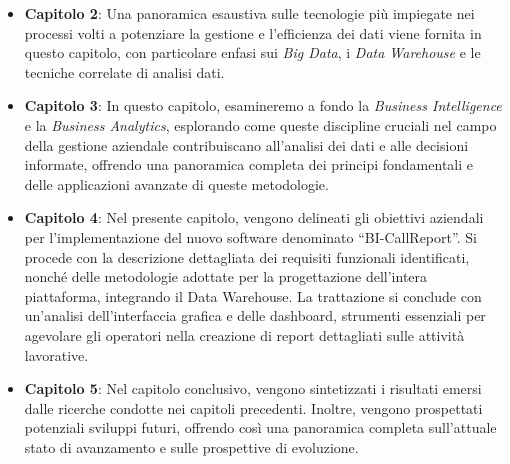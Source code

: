 \begin{itemize}
    \item \textbf{Capitolo 2}: Una panoramica esaustiva sulle tecnologie più impiegate nei processi volti a potenziare la gestione e l'efficienza dei dati viene fornita in questo capitolo, con particolare enfasi sui \textit{Big Data}, i \textit{Data Warehouse} e le tecniche correlate di analisi dati.

    \item \textbf{Capitolo 3}: In questo capitolo, esamineremo a fondo la \textit{Business Intelligence} e la \textit{Business Analytics}, esplorando come queste discipline cruciali nel campo della gestione aziendale contribuiscano all'analisi dei dati e alle decisioni informate, offrendo una panoramica completa dei principi fondamentali e delle applicazioni avanzate di queste metodologie.

    \item \textbf{Capitolo 4}: Nel presente capitolo, vengono delineati gli obiettivi aziendali per l'implementazione del nuovo software denominato ``BI-CallReport''. Si procede con la descrizione dettagliata dei requisiti funzionali identificati, nonché delle metodologie adottate per la progettazione dell'intera piattaforma, integrando il Data Warehouse. La trattazione si conclude con un'analisi dell'interfaccia grafica e delle dashboard, strumenti essenziali per agevolare gli operatori nella creazione di report dettagliati sulle attività lavorative.

    \item \textbf{Capitolo 5}: Nel capitolo conclusivo, vengono sintetizzati i risultati emersi dalle ricerche condotte nei capitoli precedenti. Inoltre, vengono prospettati potenziali sviluppi futuri, offrendo così una panoramica completa sull'attuale stato di avanzamento e sulle prospettive di evoluzione.
\end{itemize}